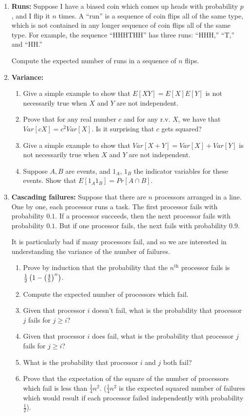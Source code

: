 \documentclass[11pt,fleqn]{article}
\begin{document}
\begin{enumerate}

\item \textbf{Runs:}
Suppose I have a biased coin which comes up heads with probability $p$,
and I flip it $n$ times.
A ``run'' is a sequence of coin flips all of the same type,
which is not contained in any longer sequence of coin flips
all of the same type.
For example, the sequence ``HHHTHH'' has three runs: ``HHH,'' ``T,''
and ``HH.''

Compute the expected number of runs in a sequence of $n$ flips. 

\item \textbf{Variance:}

\begin{enumerate}
\item Give a simple example to show that $E[XY] = E[X]E[Y]$ is not necessarily true when $X$
and $Y$ are not independent.
\item Prove that for any real number $c$ and for any r.v. $X$, we have that $Var [cX] = c^2 Var [X]$.
Is it surprising that $c$ gets squared?
\item Give a simple example to show that $Var [X + Y ] = Var [X]+Var [Y ]$ is not necessarily true
when $X$ and $Y$ are not independent.
\item Suppose $A, B$ are events, and $1_A$, $1_B$ the indicator variables for these events. Show that
$E[1_A 1_B] = Pr[A \cap B]$. 
\end{enumerate}

\item \textbf{Cascading failures:}
Suppose that there are $n$ processors arranged in a line.
One by one, each processor runs a task. The first processor 
fails with probability $0.1$. 
If a processor succeeds, then
the next processor fails with probability $0.1$.
But if one processor fails, the next fails with probability $0.9$.

It is particularly bad if many processors fail,
and so we are interested in understanding
the variance of the number of failures.
\begin{enumerate}
\item Prove by induction that the probability that the $n^{\text{th}}$
processor fails is $\frac 12 \left( 1 - \left(\frac 4{5}\right)^n \right)$.
\item Compute the expected number of processors which fail.
\item Given that processor $i$ doesn't fail,
what is the probability that processor $j$ fails for $j \geq i$?
\item Given that processor $i$ does fail,
what is the probability that processor $j$ fails for $j \geq i$?
\item What is the probability that processor $i$ and $j$ both fail?
\item Prove that the expectation of the square
of the number of processors which fail is less than $\frac 14 n^2$.
($\frac 14 n^2$ is the expected squared number of failures which would result
if each processor failed independently with probability $\frac 12$).
\end{enumerate}


\end{enumerate}
\end{document}
